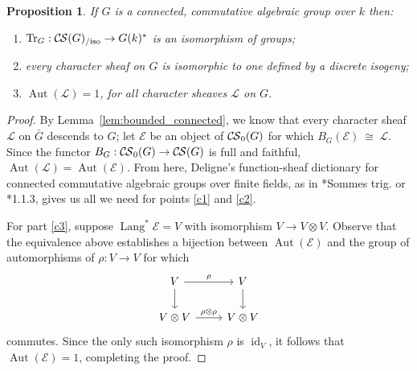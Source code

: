 \documentclass[10pt]{amsart}
\makeatletter
\theoremstyle{plain}
\newtheorem{proposition}[theorem]{Proposition}
\theoremstyle{definition}
\newcommand{\EE}{\mathbb{\bar Q}_\ell}
\newcommand{\Fq}{k}
\newcommand{\EEx}{\EE^\times}
\DeclareMathOperator{\Aut}{Aut}
\DeclareMathOperator{\id}{id}
\DeclareMathOperator{\Lang}{Lang}
\newcommand{\iso}{{\ \cong\ }}
\newcommand{\trFrob}[1]{t_{#1}}
\newcommand{\TrFrob}[1]{\operatorname{Tr}_{#1}}
\newcommand{\cs}[1]{{\mathcal{#1}}}
\newcommand{\CS}{{\mathcal{C\hskip-0.8pt S}}}
\newcommand{\bCS}{{\CS_0}}
\newcommand{\CSiso}[1]{\CS(#1)_{/\text{iso}}}
\newcommand{\labitem}[2]{
\def\@itemlabel{\textbf{#1}}
\item
\def\@currentlabel{#1}\label{#2}}
\newcommand{\bg}{{\bar{g}}}
\newcommand{\bG}{\bar{G}}
\makeatother
\begin{document}
\begin{proposition}\label{prop:connected}
 If $G$ is a connected, commutative algebraic group over $\Fq$ then:
 \begin{enumerate}
 \labitem{(1)}{c1} $\TrFrob{G} : \CSiso{G} \to G(\Fq)^*$ is an isomorphism of groups;
 \labitem{(2)}{c2} every character sheaf on $G$ is isomorphic to one defined by a discrete isogeny;
 \labitem{(3)}{c3} $\Aut(\cs{L}) = 1$, for all character sheaves $\cs{L}$ on $G$.
 \end{enumerate}
 \end{proposition}
\begin{proof}
By Lemma~\ref{lem:bounded_connected}, we know that every character sheaf $\cs{L}$ on $\bG$ descends to $G$;
let $\cs{E}$ be an object of $\bCS(G)$ for which $B_G(\cs{E}) \iso \cs{L}$.
 Since the functor $B_G : \bCS(G) \to \CS(G)$ is full and faithful, $\Aut(\cs{L}) = \Aut(\cs{E})$.
From here, Deligne's function-sheaf dictionary for connected commutative algebraic groups over finite fields,
as in \cite{deligne:SGA4.5}*{Sommes trig.} or \cite{laumon:87a}*{1.1.3}, gives us all we need for points \ref{c1} and \ref{c2}.
\iffalse
As in the proof of Proposition~\ref{prop:finite}, use \'etale descent to see that pullback by the Lang isogeny $\Lang : G\to G$
defines an equivalence of categories between local systems on $G$ and $G(\Fq)$-equivariant local systems on $G$. 
Under this equivalence, local systems $\cs{E}$ on $G$ arising from objects in $\bCS(G)$ are matched with $G(\Fq)$-equivariant
constant local systems of rank-one on $G$, and therefore with one-dimensional representations of $G(\Fq)$. 
In the same way, pullback along the isogeny $\Lang\times\Lang : G\times G\to G\times G$ matches the extra structure
$\mu_\cs{E} : m^*\cs{E} \to \cs{E}\boxtimes\cs{E}$ with an isomorphism $m^*V \to V\boxtimes V$ of one-dimensional
representations of $G(\Fq)\times G(\Fq)$, which is exactly an isomorphism $V \to V\otimes V$ of one-dimensional representations,
which is exactly the choice of an isomorphism $V\iso \EE$.
We see that $\bCS(G)$ is equivalent to the category of characters of $G(\Fq)$.
Let $\bg$ be a geometric point above $g \in G(\Fq)$.  If $\cs{E}$ matches $\psi : G(\Fq)\to \EEx$ under this equivalence,
a simple calculation on stalks reveals that the action of Frobenius on $\cs{E}_{\bg}$ is multiplication by $\psi(g)^{-1}$.
In other words, for every $\cs{E}$ in $\bCS(G)$, the trace of $\Lang^*\cs{E}$ is $\trFrob{\cs{E}}^{-1}$ as a
representation of $G(\Fq)$, proving parts \ref{c1} and \ref{c2}.
\fi
For part \ref{c3}, suppose $\Lang^*\cs{E} = V$ with isomorphism $V \to V\otimes V$.
Observe that the equivalence above establishes a bijection between $\Aut(\cs{E})$ and the group of automorphisms of $\rho : V\to V$ for which 
\[
\begin{tikzcd}
\arrow{d}{} V \arrow{r}{\rho} & V\arrow{d}{}\\
V\otimes V \arrow{r}{\rho\otimes \rho} & V\otimes V
\end{tikzcd}
\]
commutes. 
Since the only such isomorphism $\rho$ is $\id_V$, it follows that $\Aut(\cs{E}) = 1$, completing the proof.
\end{proof}
\end{document}
